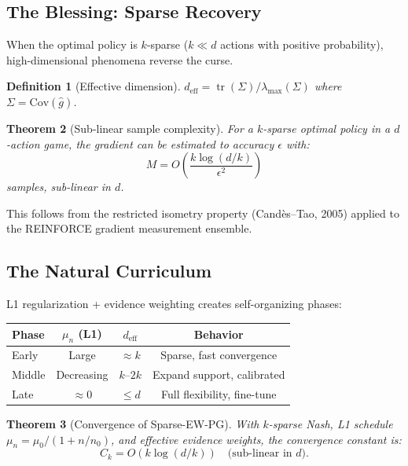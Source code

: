 \documentclass[11pt,a4paper]{article}
\newtheorem{theorem}{Theorem}[section]
\newtheorem{definition}[theorem]{Definition}
\DeclareMathOperator{\tr}{tr}
\begin{document}
\subsection{The Blessing: Sparse Recovery}

When the optimal policy is $k$-sparse ($k \ll d$ actions with
positive probability), high-dimensional phenomena reverse the curse.

\begin{definition}[Effective dimension]
$d_{\text{eff}} = \tr(\Sigma) / \lambda_{\max}(\Sigma)$
where $\Sigma = \text{Cov}(\hat{g})$.
\end{definition}

\begin{theorem}[Sub-linear sample complexity]\label{thm:blessing}
For a $k$-sparse optimal policy in a $d$-action game, the gradient
can be estimated to accuracy $\epsilon$ with:
\begin{equation}
    M = O\!\left(\frac{k \log(d/k)}{\epsilon^2}\right)
\end{equation}
samples, sub-linear in $d$.
\end{theorem}

This follows from the restricted isometry property (Cand\`es--Tao, 2005)
applied to the REINFORCE gradient measurement ensemble.

\subsection{The Natural Curriculum}

L1 regularization + evidence weighting creates self-organizing phases:

\begin{center}
\begin{tabular}{lccc}
\toprule
\textbf{Phase} & $\mu_n$ (L1) & $d_{\text{eff}}$ & \textbf{Behavior} \\
\midrule
Early   & Large   & $\approx k$   & Sparse, fast convergence \\
Middle  & Decreasing & $k$--$2k$ & Expand support, calibrated \\
Late    & $\approx 0$ & $\leq d$  & Full flexibility, fine-tune \\
\bottomrule
\end{tabular}
\end{center}

\begin{theorem}[Convergence of Sparse-EW-PG]\label{thm:sparse-conv}
With $k$-sparse Nash, L1 schedule $\mu_n = \mu_0/(1+n/n_0)$, and
effective evidence weights, the convergence constant is:
\begin{equation}
    C_k = O(k \log(d/k)) \quad \text{(sub-linear in $d$)}.
\end{equation}
\end{theorem}
\end{document}
